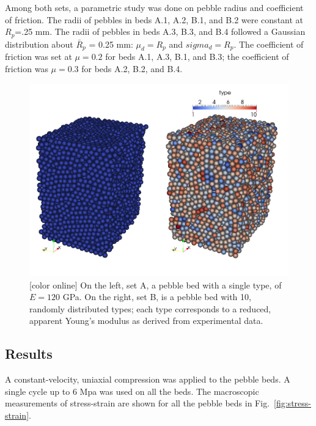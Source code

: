 Among both sets, a parametric study was done on pebble radius and coefficient of friction. The radii of pebbles in beds A.1, A.2, B.1, and B.2 were constant at $R_p$=.25 mm. The radii of pebbles in beds A.3, B.3, and B.4 followed a Gaussian distribution about $\bar{R}_p$ = 0.25 mm: $\mu_d = R_p$ and $sigma_d = R_p$. The coefficient of friction was set at $\mu = 0.2$ for beds A.1, A.3, B.1, and B.3; the coefficient of friction was $\mu = 0.3$ for beds A.2, B.2, and B.4.


\begin{figure}[t]
  \centering
  \includegraphics[width = 0.75 \textwidth]{chapters/figures/DEM-types}
  \caption{[color online] On the left, set A, a pebble bed with a single type, of $E = 120$ GPa. On the right, set B, is a pebble bed with 10, randomly distributed types; each type corresponds to a reduced, apparent Young's modulus as derived from experimental data.}\label{fig:dem-types}
\end{figure}





\subsection{Results}


A constant-velocity, uniaxial compression was applied to the pebble beds. A single cycle up to 6 Mpa was used on all the beds. The macroscopic measurements of stress-strain are shown for all the pebble beds in Fig.~\ref{fig:stress-strain}.

